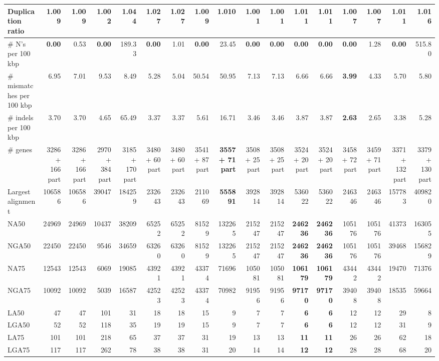 \documentclass[12pt,a4paper]{article}
\begin{document}
\begin{table}[ht]
\begin{center}
\begin{tabular}{|l*{16}{|r}|}
Duplication ratio & 1.009 & 1.009 & 1.002 & 1.044 & 1.027 & 1.027 & 1.009 & 1.010 & {\bf 1.001} & {\bf 1.001} & 1.011 & 1.011 & 1.007 & 1.007 & 1.011 & 1.016 \\ \hline
\# N's per 100 kbp & {\bf 0.00} & 0.53 & {\bf 0.00} & 189.33 & {\bf 0.00} & 1.01 & {\bf 0.00} & 23.45 & {\bf 0.00} & {\bf 0.00} & {\bf 0.00} & {\bf 0.00} & {\bf 0.00} & 1.28 & {\bf 0.00} & 515.80 \\ \hline
\# mismatches per 100 kbp & 6.95 & 7.01 & 9.53 & 8.49 & 5.28 & 5.04 & 50.54 & 50.95 & 7.13 & 7.13 & 6.66 & 6.66 & {\bf 3.99} & 4.33 & 5.70 & 5.80 \\ \hline
\# indels per 100 kbp & 3.70 & 3.70 & 4.65 & 65.49 & 3.37 & 3.37 & 5.61 & 16.71 & 3.46 & 3.46 & 3.87 & 3.87 & {\bf 2.63} & 2.65 & 3.38 & 5.28 \\ \hline
\# genes & 3286 + 166 part & 3286 + 166 part & 2970 + 384 part & 3185 + 170 part & 3480 + 60 part & 3480 + 60 part & 3541 + 87 part & {\bf 3557 + 71 part} & 3508 + 25 part & 3508 + 25 part & 3524 + 20 part & 3524 + 20 part & 3458 + 72 part & 3459 + 71 part & 3371 + 132 part & 3379 + 130 part \\ \hline
Largest alignment & 106586 & 106586 & 39047 & 184259 & 232643 & 232643 & 211069 & {\bf 555891} & 392814 & 392814 & 536022 & 536022 & 246346 & 246346 & 157783 & 409820 \\ \hline
NA50 & 24969 & 24969 & 10437 & 38209 & 65252 & 65252 & 81529 & 132265 & 215247 & 215247 & {\bf 246236} & {\bf 246236} & 105176 & 105176 & 41373 & 163055 \\ \hline
NGA50 & 22450 & 22450 & 9546 & 34659 & 63260 & 63260 & 81529 & 132265 & 215247 & 215247 & {\bf 246236} & {\bf 246236} & 105176 & 105176 & 39468 & 156829 \\ \hline
NA75 & 12543 & 12543 & 6069 & 19085 & 43921 & 43921 & 43374 & 71696 & 105081 & 105081 & {\bf 106179} & {\bf 106179} & 43442 & 43442 & 19470 & 71376 \\ \hline
NGA75 & 10092 & 10092 & 5039 & 16587 & 42523 & 42523 & 43374 & 70982 & 91956 & 91956 & {\bf 97170} & {\bf 97170} & 39408 & 39408 & 18535 & 59664 \\ \hline
LA50 & 47 & 47 & 101 & 31 & 18 & 18 & 15 & 9 & 7 & 7 & {\bf 6} & {\bf 6} & 12 & 12 & 29 & 8 \\ \hline
LGA50 & 52 & 52 & 118 & 35 & 19 & 19 & 15 & 9 & 7 & 7 & {\bf 6} & {\bf 6} & 12 & 12 & 31 & 9 \\ \hline
LA75 & 101 & 101 & 218 & 65 & 37 & 37 & 31 & 19 & 13 & 13 & {\bf 11} & {\bf 11} & 26 & 26 & 62 & 18 \\ \hline
LGA75 & 117 & 117 & 262 & 78 & 38 & 38 & 31 & 20 & 14 & 14 & {\bf 12} & {\bf 12} & 28 & 28 & 68 & 20 \\ \hline
\end{tabular}
\end{center}
\end{table}
\end{document}
